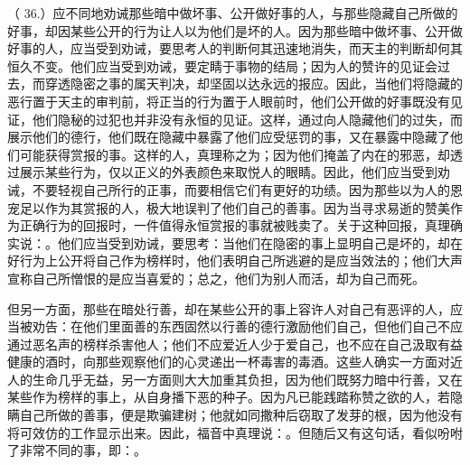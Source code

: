 （ 36.）应不同地劝诫那些暗中做坏事、公开做好事的人，与那些隐藏自己所做的好事，却因某些公开的行为让人以为他们是坏的人。因为那些暗中做坏事、公开做好事的人，应当受到劝诫，要思考人的判断何其迅速地消失，而天主的判断却何其恒久不变。他们应当受到劝诫，要定睛于事物的结局；因为人的赞许的见证会过去，而穿透隐密之事的属天判决，却坚固以达永远的报应。因此，当他们将隐藏的恶行置于天主的审判前，将正当的行为置于人眼前时，他们公开做的好事既没有见证，他们隐秘的过犯也并非没有永恒的见证。这样，通过向人隐藏他们的过失，而展示他们的德行，他们既在隐藏中暴露了他们应受惩罚的事，又在暴露中隐藏了他们可能获得赏报的事。这样的人，真理称之为；因为他们掩盖了内在的邪恶，却透过展示某些行为，仅以正义的外表颜色来取悦人的眼睛。因此，他们应当受到劝诫，不要轻视自己所行的正事，而要相信它们有更好的功绩。因为那些以为人的恩宠足以作为其赏报的人，极大地误判了他们自己的善事。因为当寻求易逝的赞美作为正确行为的回报时，一件值得永恒赏报的事就被贱卖了。关于这种回报，真理确实说：。他们应当受到劝诫，要思考：当他们在隐密的事上显明自己是坏的，却在好行为上公开将自己作为榜样时，他们表明自己所逃避的是应当效法的；他们大声宣称自己所憎恨的是应当喜爱的；总之，他们为别人而活，却为自己而死。\par

但另一方面，那些在暗处行善，却在某些公开的事上容许人对自己有恶评的人，应当被劝告：在他们里面善的东西固然以行善的德行激励他们自己，但他们自己不应通过恶名声的榜样杀害他人；他们不应爱近人少于爱自己，也不应在自己汲取有益健康的酒时，向那些观察他们的心灵递出一杯毒害的毒酒。这些人确实一方面对近人的生命几乎无益，另一方面则大大加重其负担，因为他们既努力暗中行善，又在某些作为榜样的事上，从自身播下恶的种子。因为凡已能践踏称赞之欲的人，若隐瞒自己所做的善事，便是欺骗建树；他就如同撒种后窃取了发芽的根，因为他没有将可效仿的工作显示出来。因此，福音中真理说：。但随后又有这句话，看似吩咐了非常不同的事，即：。\par

